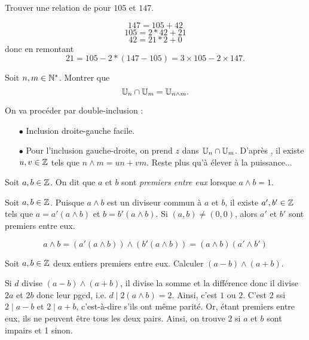 \documentclass{magnolia}
\begin{document}
\begin{exos}
\exo Trouver une relation de  pour $105$ et $147$.
  \begin{sol}
  $$147=105+42$$
  $$105=2*42+21$$
  $$42=21*2+0$$ donc en remontant
  $$21=105-2*(147-105)=3\times 105-2\times 147.$$
  \end{sol}
\exo Soit $n,m\in{\mathbb{N}^*}$. Montrer que
  \[\U[n]\cap\U[m]=\U[n\wedge m].\]
  \begin{sol}
  On va procéder par double-inclusion :
  \begin{itemize}
\item[$\bullet$] Inclusion droite-gauche facile.
\item[$\bullet$] Pour l'inclusion gauche-droite, on prend $z$ dans $\U[n]\cap\U[m]$. D'après , il existe $u,v\in \mathbb{Z}$ tels que $n\wedge m=un+vm$. Reste plus qu'à élever à la puissance...
\end{itemize}
  \end{sol}
\end{exos}

\begin{definition}
Soit $a,b\in\mathbb{Z}$. On dit que $a$ et $b$ sont \emph{premiers entre eux} lorsque
$a\wedge b=1$.
\end{definition}

\begin{remarqueUnique}
\remarque Soit $a,b\in\mathbb{Z}$. Puisque $a\wedge b$ est un diviseur commun à $a$ et
  $b$, il existe $a',b'\in\mathbb{Z}$ tels que $a=a'(a\wedge b)$ et $b=b'(a\wedge b)$.
  Si $(a,b)\neq (0,0)$, alors $a'$ et $b'$ sont premiers entre eux.
  \begin{sol}
  $$a\wedge b=(a'(a\wedge b))\wedge (b'(a\wedge b))=(a\wedge b)(a'\wedge b')$$
  \end{sol}
\end{remarqueUnique}

\begin{exoUnique}
\exo Soit $a,b\in\mathbb{Z}$ deux entiers premiers entre eux. Calculer
  $(a-b)\wedge(a+b)$.
  \begin{sol}
  Si $d$ divise $(a-b)\wedge(a+b)$, il divise la somme et la différence donc il divise $2a$ et $2b$ donc leur pgcd, i.e. $d\mid 2(a\wedge b)=2$. Ainsi, c'est $1$ ou $2$. C'est $2$ ssi $2\mid a-b$ et $2\mid a+b$, c'est-à-dire s'ils ont même parité. Or, étant premiers entre eux, ils ne peuvent être tous les deux pairs. Ainsi, on trouve 2 si $a$ et $b$ sont impairs et 1 sinon.
  \end{sol}
\end{exoUnique}
\end{document}
